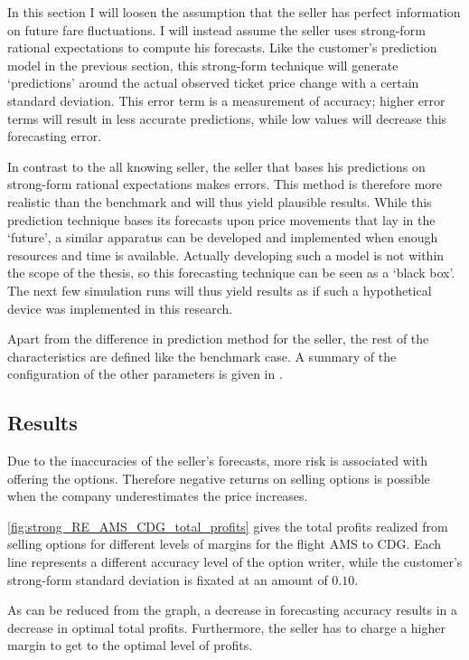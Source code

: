 In this section I will loosen the assumption that the seller has perfect information on future fare fluctuations. I will instead assume the seller uses strong-form rational expectations to compute his forecasts. Like the customer's prediction model in the previous section, this strong-form technique will generate `predictions' around the actual observed ticket price change with a certain standard deviation. This error term is a measurement of accuracy; higher error terms will result in less accurate predictions, while low values will decrease this forecasting error.

In contrast to the all knowing seller, the seller that bases his predictions on strong-form rational expectations makes errors. This method is therefore more realistic than the benchmark and will thus yield plausible results. While this prediction technique bases its forecasts upon price movements that lay in the `future', a similar apparatus can be developed and implemented when enough resources and time is available. Actually developing such a model is not within the scope of the thesis, so this forecasting technique can be seen as a `black box'. The next few simulation runs will thus yield results as if such a hypothetical device was implemented in this research.

Apart from the difference in prediction method for the seller, the rest of the characteristics are defined like the benchmark case. A summary of the configuration of the other parameters is given in .



\subsection{Results}
Due to the inaccuracies of the seller's forecasts, more risk is associated with offering the options. Therefore negative returns on selling options is possible when the company underestimates the price increases.

\autoref{fig:strong_RE_AMS_CDG_total_profits} gives the total profits realized from selling options for different levels of margins for the flight AMS to CDG. Each line represents a different accuracy level of the option writer, while the customer's strong-form standard deviation is fixated at an amount of $0.10$.

As can be reduced from the graph, a decrease in forecasting accuracy results in a decrease in optimal total profits. Furthermore, the seller has to charge a higher margin to get to the optimal level of profits.

